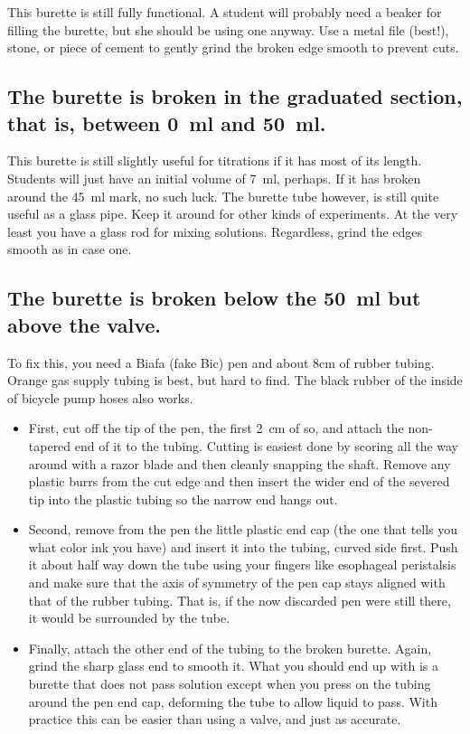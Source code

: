 This burette is still fully functional. 
A student will probably need a beaker for filling the burette, 
but she should be using one anyway. 
Use a metal file (best!), 
stone, 
or piece of cement to gently grind the broken edge smooth to prevent cuts.

\subsection{The burette is broken in the graduated section, 
that is, 
between 0~ml and 50~ml.}
This burette is still slightly useful for titrations 
if it has most of its length. 
Students will just have an initial volume of 7~ml, 
perhaps. 
If it has broken around the 45~ml mark, 
no such luck. 
The burette tube however, 
is still quite useful as a glass pipe. 
Keep it around for other kinds of experiments. 
At the very least you have a glass rod for mixing solutions. 
Regardless, 
grind the edges smooth as in case one.

\subsection{The burette is broken below the 50~ml but above the valve.}
To fix this, 
you need a Biafa (fake Bic) pen and about 8cm of rubber tubing. 
Orange gas supply tubing is best, 
but hard to find. 
The black rubber of the inside of bicycle pump hoses also works. 
\begin{itemize}
\item First, 
cut off the tip of the pen, 
the first 2~cm of so, 
and attach the non-tapered end of it to the tubing. 
Cutting is easiest done by scoring all the way around 
with a razor blade and then cleanly snapping the shaft. 
Remove any plastic burrs from the cut edge 
and then insert the wider end of the severed tip 
into the plastic tubing so the narrow end hangs out. 
\item Second, 
remove from the pen the little plastic end cap 
(the one that tells you what color ink you have) 
and insert it into the tubing, 
curved side first. 
Push it about half way down the tube using your 
fingers like esophageal peristalsis and make sure that 
the axis of symmetry of the pen cap stays aligned 
with that of the rubber tubing. 
That is, 
if the now discarded pen were still there, 
it would be surrounded by the tube. 
\item Finally, 
attach the other end of the tubing to the broken burette. 
Again, 
grind the sharp glass end to smooth it. 
What you should end up with is a burette that does not pass solution 
except when you press on the tubing around the pen end cap, 
deforming the tube to allow liquid to pass. 
With practice this can be easier than using a valve, 
and just as accurate.
\end{itemize}

